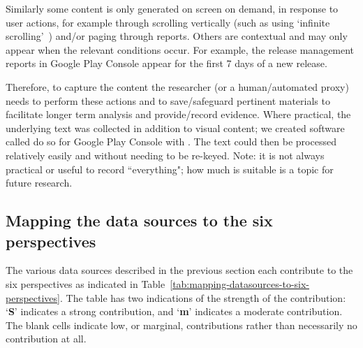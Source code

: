 Similarly some content is only generated on screen on demand, in response to user actions, for example through scrolling vertically (such as using `infinite scrolling'~) and/or paging through reports. Others are contextual and may only appear when the relevant conditions occur. For example, the release management reports in Google Play Console appear for the first 7 days of a new release. 

Therefore, to capture the content the researcher (or a human/automated proxy) needs to perform these actions and to save/safeguard pertinent materials to facilitate longer term analysis and provide/record evidence. Where practical, the underlying text was collected in addition to visual content; we created software called  do so for Google Play Console with . The text could then be processed relatively easily and without needing to be re-keyed. Note: it is not always practical or useful to record ``everything"; how much is suitable is a topic for future research. 

\subsection{Mapping the data sources to the six perspectives}
The various data sources described in the previous section each contribute to the six perspectives as indicated in Table~\ref{tab:mapping-datasources-to-six-perspectives}. The table has two indications of the strength of the contribution: `\textbf{S}' indicates a strong contribution, and `\textbf{m}' indicates a moderate contribution. The blank cells indicate low, or marginal, contributions rather than necessarily no contribution at all.

